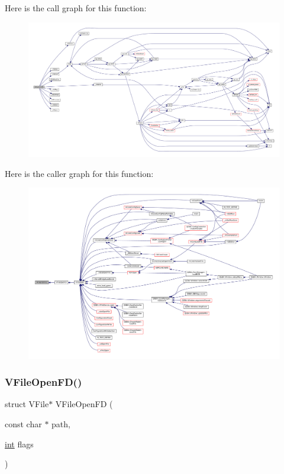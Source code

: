 Here is the call graph for this function\+:
\nopagebreak
\begin{figure}[H]
\begin{center}
\leavevmode
\includegraphics[width=350pt]{vfs-fd_8c_aae510cbd565bd600f316891c3fdfd222_cgraph}
\end{center}
\end{figure}
Here is the caller graph for this function\+:
\nopagebreak
\begin{figure}[H]
\begin{center}
\leavevmode
\includegraphics[width=350pt]{vfs-fd_8c_aae510cbd565bd600f316891c3fdfd222_icgraph}
\end{center}
\end{figure}
\mbox{\label{vfs-fd_8c_a016745f678d9f575dd5ba79977ba1023}} 
\subsubsection{\texorpdfstring{V\+File\+Open\+F\+D()}{VFileOpenFD()}}
{\footnotesize\ttfamily struct V\+File$\ast$ V\+File\+Open\+FD (\begin{DoxyParamCaption}\item[{const char $\ast$}]{path,  }\item[{\mbox{\hyperlink{ioapi_8h_a787fa3cf048117ba7123753c1e74fcd6}{int}}}]{flags }\end{DoxyParamCaption})}

